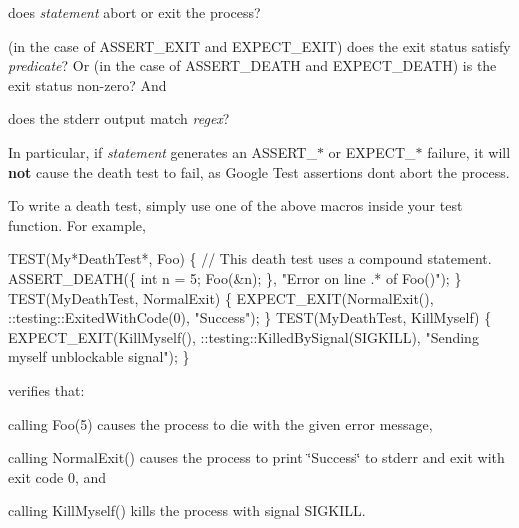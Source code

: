 \begin{DoxyEnumerate}
\item does {\itshape statement} abort or exit the process?
\end{DoxyEnumerate}
\begin{DoxyEnumerate}
\item (in the case of {\ttfamily A\+S\+S\+E\+R\+T\+\_\+\+E\+X\+IT} and {\ttfamily E\+X\+P\+E\+C\+T\+\_\+\+E\+X\+IT}) does the exit status satisfy {\itshape predicate}? Or (in the case of {\ttfamily A\+S\+S\+E\+R\+T\+\_\+\+D\+E\+A\+TH} and {\ttfamily E\+X\+P\+E\+C\+T\+\_\+\+D\+E\+A\+TH}) is the exit status non-\/zero? And
\end{DoxyEnumerate}
\begin{DoxyEnumerate}
\item does the stderr output match {\itshape regex}?
\end{DoxyEnumerate}

In particular, if {\itshape statement} generates an {\ttfamily A\+S\+S\+E\+R\+T\+\_\+$\ast$} or {\ttfamily E\+X\+P\+E\+C\+T\+\_\+$\ast$} failure, it will {\bfseries not} cause the death test to fail, as Google Test assertions don\textquotesingle{}t abort the process.

To write a death test, simply use one of the above macros inside your test function. For example,


\begin{DoxyCode}
TEST(My*DeathTest*, Foo) \{
  // This death test uses a compound statement.
  ASSERT\_DEATH(\{ int n = 5; Foo(&n); \}, "Error on line .* of Foo()");
\}
TEST(MyDeathTest, NormalExit) \{
  EXPECT\_EXIT(NormalExit(), ::testing::ExitedWithCode(0), "Success");
\}
TEST(MyDeathTest, KillMyself) \{
  EXPECT\_EXIT(KillMyself(), ::testing::KilledBySignal(SIGKILL), "Sending myself unblockable signal");
\}
\end{DoxyCode}


verifies that\+:


\begin{DoxyItemize}
\item calling {\ttfamily Foo(5)} causes the process to die with the given error message,
\item calling {\ttfamily Normal\+Exit()} causes the process to print {\ttfamily \char`\"{}\+Success\char`\"{}} to stderr and exit with exit code 0, and
\item calling {\ttfamily Kill\+Myself()} kills the process with signal {\ttfamily S\+I\+G\+K\+I\+LL}.
\end{DoxyItemize}

